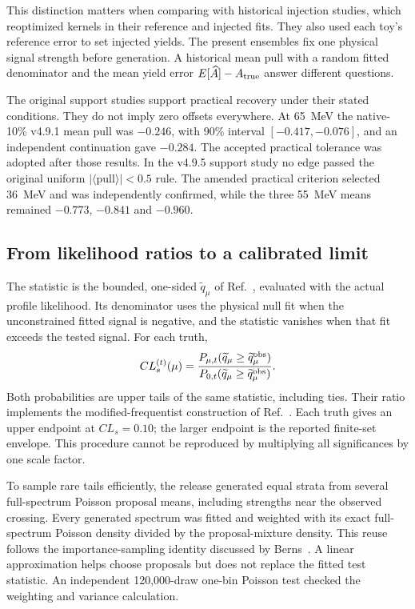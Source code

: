 This distinction matters when comparing with historical injection studies,
which reoptimized kernels in their reference and injected fits. They also
used each toy's reference error to set injected yields. The present
ensembles fix one physical signal strength before generation. A historical
mean pull with a random fitted denominator and the mean yield error
$E[\widehat A]-A_{\rm true}$ answer different questions.

The original support studies support practical recovery under their stated
conditions. They do not imply zero offsets everywhere. At 65~MeV the
native-10\% v4.9.1 mean pull was $-0.246$, with 90\% interval
$[-0.417,-0.076]$, and an independent continuation gave $-0.284$.
The accepted practical tolerance was adopted after those results. In the
v4.9.5 support study no edge passed the original uniform
$|\langle\mathrm{pull}\rangle|<0.5$ rule. The amended practical criterion
selected 36~MeV and was independently confirmed, while the three
55~MeV means remained $-0.773$, $-0.841$ and $-0.960$.

\subsection{From likelihood ratios to a calibrated limit}
The statistic is the bounded, one-sided $\widetilde q_\mu$ of
Ref.~\cite{Cowan2011}, evaluated with the actual profile likelihood.
Its denominator uses the physical null fit when the unconstrained fitted
signal is negative, and the statistic vanishes when that fit exceeds the
tested signal. For each truth,
\begin{equation}
 CL_s^{(t)}(\mu)=
 \frac{P_{\mu,t}(\widetilde q_\mu\geq\widetilde q_\mu^{\rm obs})}
      {P_{0,t}(\widetilde q_\mu\geq\widetilde q_\mu^{\rm obs})}.
 \label{v5-eq:empirical-cls}
\end{equation}
Both probabilities are upper tails of the same statistic, including ties.
Their ratio implements the modified-frequentist construction
of Ref.~\cite{Read2002}. Each truth gives an upper endpoint at
$CL_s=0.10$; the larger endpoint is the reported finite-set envelope.
This procedure cannot be reproduced by multiplying all significances by
one scale factor.

To sample rare tails efficiently, the release generated equal strata
from several full-spectrum Poisson proposal means, including strengths
near the observed crossing. Every generated spectrum was fitted and
weighted with its exact full-spectrum Poisson density divided by the
proposal-mixture density. This reuse follows the importance-sampling
identity discussed by Berns~\cite{Berns2024}. A linear approximation
helps choose proposals but does not replace the fitted test statistic.
An independent 120,000-draw one-bin Poisson test checked the weighting
and variance calculation.

